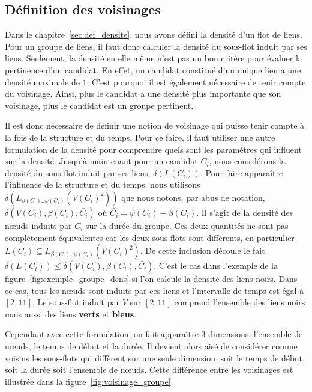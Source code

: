 \subsection{Définition des voisinages}
Dans le chapitre~\ref{sec:def_densite}, nous avons défini la densité d'un flot de liens.
Pour un groupe de liens, il faut donc calculer la densité du sous-flot induit par ses liens.
Seulement, la densité en elle même n'est pas un bon critère pour évaluer la pertinence d'un candidat.
En effet, un candidat constitué d'un unique lien a une densité maximale de $1$.
C'est pourquoi il est également nécessaire de tenir compte du voisinage.
Ainsi, plus le candidat a une densité plus importante que son voisinage, plus le candidat est un groupe pertinent.

Il est donc nécessaire de définir une notion de voisinage qui puisse tenir compte à la fois de la structure et du temps.
Pour ce faire, il faut utiliser une autre formulation de la densité pour comprendre quels sont les paramètres qui influent sur la densité.
Jusqu'à maintenant pour un candidat $C_i$, nous considérons la densité du sous-flot induit par ses liens, $\delta(L(C_i))$.
Pour faire apparaître l'influence de la structure et du temps, nous utilisons $\delta(L_{\beta(C_i)..\psi(C_i)}(V(C_i)^2))$ que nous notons, par abus de notation, $\delta(V(C_i),\beta(C_i), \bar{C_i})$ où $\bar{C_i} = \psi(C_i)-\beta(C_i)$.
Il s'agit de la densité des n\oe{}uds induits par $C_i$ sur la durée du groupe.
Ces deux quantités ne sont pas complètement équivalentes car les deux sous-flots sont différents, en particulier $L(C_i) \subseteq L_{\beta(C_i)..\psi(C_i)}(V(C_i)^2)$.
De cette inclusion découle le fait $\delta(L(C_i)) \leq \delta(V(C_i),\beta(C_i), \bar{C_i})$.
C'est le cas dans l'exemple de la figure~\ref{fig:exemple_groupe_dens} si l'on calcule la densité des liens noirs.
Dans ce cas, tous les n\oe{}uds sont induits par ces liens et l'intervalle de temps est égal à $[2,11]$.
Le sous-flot induit par $V$ sur $[2,11]$ comprend l'ensemble des liens noirs mais aussi des liens \textcolor{vert_turquoise}{\textbf{verts}} et \textcolor{bleu_window}{\textbf{bleus}}.


Cependant avec cette formulation, on fait apparaître 3 dimensions: l'ensemble de n\oe{}uds, le temps de début et la durée.
Il devient alors aisé de considérer comme voisins les sous-flots qui diffèrent sur une seule dimension: soit le temps de début, soit la durée soit l'ensemble de n\oe{}uds.
Cette différence entre les voisinages est illustrée dans la figure~\ref{fig:voisinage_groupe}.

